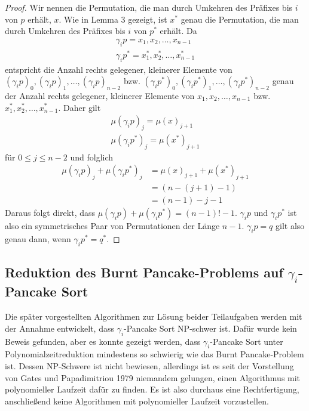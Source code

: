 \documentclass[a4paper, 10pt, ngerman]{article}
\begin{document}
\begin{proof}
    Wir nennen die Permutation, die man durch Umkehren des Präfixes bis $i$ von $p$ erhält, $x$. Wie in Lemma 3 gezeigt, ist $x^*$ genau die Permutation, die man durch Umkehren des Präfixes bis $i$ von $p^*$ erhält.
    Da
    \begin{align*}
        \gamma_i p = x_1, x_2, \dots, x_{n-1} \\
        \gamma_i p^* = x^*_1, x^*_2, \dots, x^*_{n-1}
    \end{align*}
    entspricht die Anzahl rechts gelegener, kleinerer Elemente von $(\gamma_i p)_0, (\gamma_i p)_1, \dots, (\gamma_i p)_{n - 2}$ bzw. $(\gamma_i p^*)_0, (\gamma_i p^*)_1, \dots, (\gamma_i p^*)_{n - 2}$ genau der Anzahl rechts gelegener, kleinerer Elemente von $x_1, x_2, \dots, x_{n-1}$ bzw. $x^*_1, x^*_2, \dots, x^*_{n-1}$. Daher gilt
    \begin{align*}
        \mu(\gamma_i p)_j = \mu(x)_{j + 1} \\
        \mu(\gamma_i p^*)_j = \mu(x^*)_{j + 1}
    \end{align*}
    für $0 \le j \le n - 2$ und folglich
    \begin{align*}
        \mu(\gamma_i p)_j + \mu(\gamma_i p^*)_j & = \mu(x)_{j + 1} + \mu(x^*)_{j + 1} \\
                                                & = (n - (j + 1) - 1)                 \\
                                                & = (n - 1) - j - 1
    \end{align*}
    Daraus folgt direkt, dass $\mu(\gamma_i p) + \mu(\gamma_i p^*) = (n -1)! - 1$.  $\gamma_i p$ und $\gamma_i p^*$ ist also ein symmetrisches Paar von Permutationen der Länge $n - 1$. $\gamma_i p = q$ gilt also genau dann, wenn $\gamma_i p^* = q^*$.
\end{proof}

\subsection{Reduktion des Burnt Pancake-Problems auf $\gamma_i$-Pancake Sort}

Die später vorgestellten Algorithmen zur Lösung beider Teilaufgaben werden mit der Annahme entwickelt, dass $\gamma_i$-Pancake Sort NP-schwer ist. Dafür wurde kein Beweis gefunden, aber es konnte gezeigt werden, dass $\gamma_i$-Pancake Sort unter Polynomialzeitreduktion mindestens so schwierig wie das Burnt Pancake-Problem ist. Dessen NP-Schwere ist nicht bewiesen, allerdings ist es seit der Vorstellung von Gates und Papadimitriou 1979 \cite{bounds} niemandem gelungen, einen Algorithmus mit polynomieller Laufzeit dafür zu finden. Es ist also durchaus eine Rechtfertigung, anschließend keine Algorithmen mit polynomieller Laufzeit vorzustellen.
\end{document}
